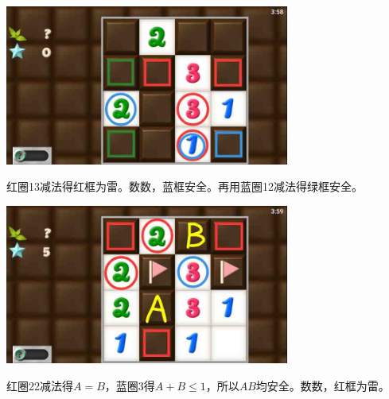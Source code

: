 \subsection{} %
\begin{center}
    \includegraphics[width=0.7\textwidth]{puzzlelow/99-1.jpg}
\end{center}
红圈13减法得红框为雷。数数，蓝框安全。再用蓝圈12减法得绿框安全。
\begin{center}
    \includegraphics[width=0.7\textwidth]{puzzlelow/99-2.jpg}
\end{center}
红圈22减法得$A=B$，蓝圈3得$A+B\le 1$，所以$AB$均安全。数数，红框为雷。


